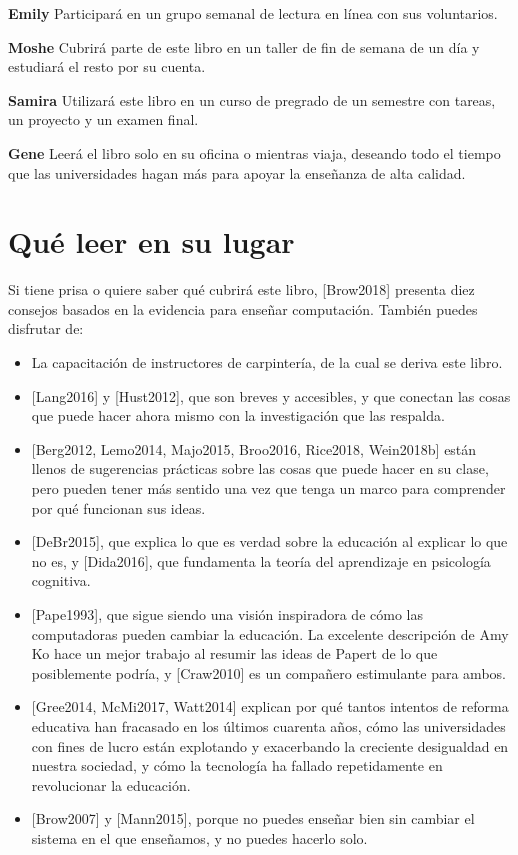 \documentclass[
]{book}
\begin{document}
\textbf{Emily} Participará en un grupo semanal de lectura en línea con sus voluntarios.

\textbf{Moshe} Cubrirá parte de este libro en un taller de fin de semana de un día y estudiará el resto por su cuenta.

\textbf{Samira} Utilizará este libro en un curso de pregrado de un semestre con tareas, un proyecto y un examen final.

\textbf{Gene} Leerá el libro solo en su oficina o mientras viaja, deseando todo el tiempo que las universidades hagan más para apoyar la enseñanza de alta calidad.

\hypertarget{quuxe9-leer-en-su-lugar}{%
\section{Qué leer en su lugar}\label{quuxe9-leer-en-su-lugar}}

Si tiene prisa o quiere saber qué cubrirá este libro, {[}Brow2018{]} presenta diez consejos basados en la evidencia para enseñar computación. También puedes disfrutar de:

\begin{itemize}
\item
  La capacitación de instructores de carpintería, de la cual se deriva este libro.
\item
  {[}Lang2016{]} y {[}Hust2012{]}, que son breves y accesibles, y que conectan las cosas que puede hacer ahora mismo con la investigación que las respalda.
\item
  {[}Berg2012, Lemo2014, Majo2015, Broo2016, Rice2018, Wein2018b{]} están llenos de sugerencias prácticas sobre las cosas que puede hacer en su clase, pero pueden tener más sentido una vez que tenga un marco para comprender por qué funcionan sus ideas.
\item
  {[}DeBr2015{]}, que explica lo que es verdad sobre la educación al explicar lo que no es, y {[}Dida2016{]}, que fundamenta la teoría del aprendizaje en psicología cognitiva.
\item
  {[}Pape1993{]}, que sigue siendo una visión inspiradora de cómo las computadoras pueden cambiar la educación. La excelente descripción de Amy Ko hace un mejor trabajo al resumir las ideas de Papert de lo que posiblemente podría, y {[}Craw2010{]} es un compañero estimulante para ambos.
\item
  {[}Gree2014, McMi2017, Watt2014{]} explican por qué tantos intentos de reforma educativa han fracasado en los últimos cuarenta años, cómo las universidades con fines de lucro están explotando y exacerbando la creciente desigualdad en nuestra sociedad, y cómo la tecnología ha fallado repetidamente en revolucionar la educación.
\item
  {[}Brow2007{]} y {[}Mann2015{]}, porque no puedes enseñar bien sin cambiar el sistema en el que enseñamos, y no puedes hacerlo solo.
\end{itemize}
\end{document}
